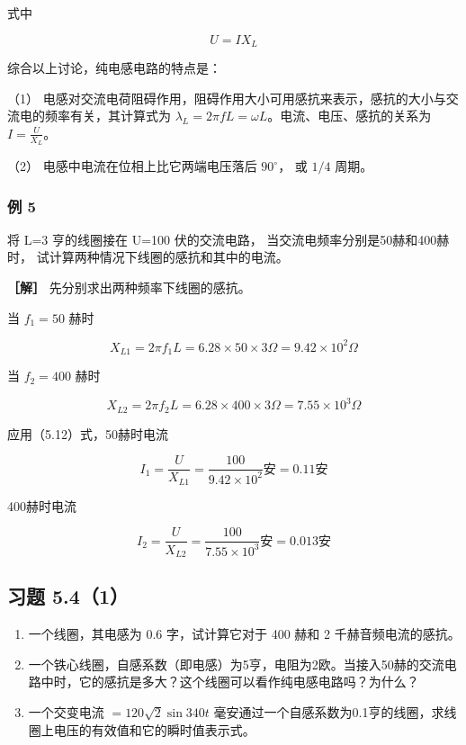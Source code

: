 式中

\[
U = I X_{L}
\]

综合以上讨论，纯电感电路的特点是：

（1）
电感对交流电荷阻碍作用，阻碍作用大小可用感抗来表示，感抗的大小与交流电的频率有关，其计算式为
\(\lambda_{L} = 2\pi fL = \omega L\)。电流、电压、感抗的关系为
\(I = \frac{U}{X_L}\)。

（2） 电感中电流在位相上比它两端电压落后 \(90^{\circ}\)， 或 \(1/4\)
周期。

\subsubsection{例 5}\label{ux4f8b-5-3}

将 L=3 亨的线圈接在 U=100 伏的交流电路，
当交流电频率分别是50赫和400赫时，
试计算两种情况下线圈的感抗和其中的电流。

\textbf{［解］} 先分别求出两种频率下线圈的感抗。

当 \(f_{1} = 50\) 赫时

\[
X_{L 1} = 2 \pi f_{1} L = 6.28 \times 50 \times 3 \Omega = 9.42 \times 10^{2} \Omega
\]

当 \(f_{2} = 400\) 赫时

\[
X_{L2}=2\pi f_{2}L = 6.28 \times 400 \times 3 \Omega=7.55 \times 10^{3} \Omega
\]

应用（5.12）式，50赫时电流

\[
I_{1} = \frac{U}{X_{L 1}} = \frac{100}{9.42 \times 10^{2}} \text{安} = 0.11 \text{安}
\]

400赫时电流

\[
I_{2} = \frac{U}{X_{L 2}} = \frac{100}{7.55 \times 10^{3}} \text{安} = 0.013 \text{安}
\]

\subsection{习题 5.4（1）}\label{ux4e60ux9898-5.41}

\begin{enumerate}
\def\labelenumi{\arabic{enumi}.}
\item
  一个线圈，其电感为 0.6 字，试计算它对于 400 赫和 2
  千赫音频电流的感抗。
\item
  一个铁心线圈，自感系数（即电感）为5亨，电阻为2欧。当接入50赫的交流电路中时，它的感抗是多大？这个线圈可以看作纯电感电路吗？为什么？
\item
  一个交变电流 \(= 120\sqrt{2}\sin 340t\)
  毫安通过一个自感系数为0.1亨的线圈，求线圈上电压的有效值和它的瞬时值表示式。
\end{enumerate}

